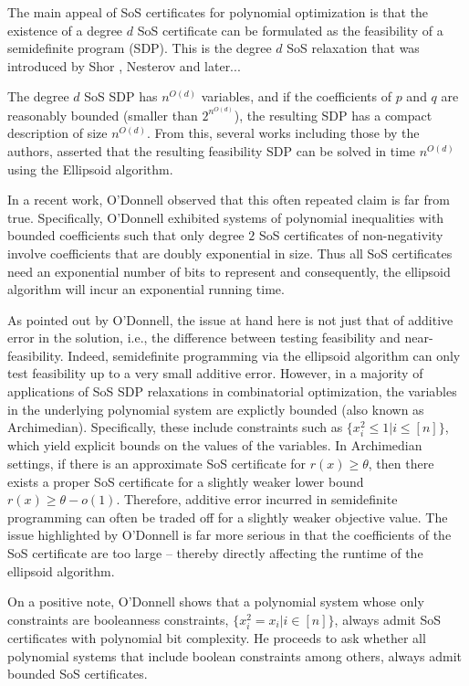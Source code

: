 The main appeal of SoS certificates for polynomial optimization is that the existence of a degree $d$ SoS certificate can be formulated as the feasibility of a semidefinite program (SDP).
%
This is the degree $d$ SoS relaxation that was introduced by Shor \cite{Shor87}, Nesterov \cite{Nes00} and later...

The degree $d$ SoS SDP has $n^{O(d)}$ variables, and if the coefficients of $p$ and $q$ are reasonably bounded (smaller than $2^{n^{O(d)}}$), the resulting SDP has a compact description of size $n^{O(d)}$.
%
From this, several works including those by the authors, asserted that the resulting feasibility SDP can be solved in time $n^{O(d)}$ using the Ellipsoid algorithm.

In a recent work, O'Donnell \cite{odonnell17} observed that this often repeated claim is far from true.
%
Specifically, O'Donnell exhibited systems of polynomial inequalities with bounded coefficients such that only degree $2$ SoS certificates of non-negativity involve coefficients that are doubly exponential in size.
%
Thus all SoS certificates need an exponential number of bits to represent and consequently, the ellipsoid algorithm will incur an exponential running time.
%
 
As pointed out by O'Donnell, the issue at hand here is not just that of additive error in the solution, i.e., the difference between testing feasibility and near-feasibility.  
%
Indeed, semidefinite programming via the ellipsoid algorithm can only test feasibility up to a very small additive error.
%
However, in a majority of applications of SoS SDP relaxations in combinatorial optimization, the variables in the underlying polynomial system are explictly bounded (also known as Archimedian).
%
Specifically, these include constraints such as $\{ x_i^2 \leq 1 | i \leq [n]\}$, which yield explicit bounds on the values of the variables.
%
In Archimedian settings, if there is an approximate SoS certificate for $r(x) \geq \theta$, then there exists a proper SoS certificate for a slightly weaker lower bound $r(x) \geq \theta - o(1)$.
%
Therefore, additive error incurred in semidefinite programming can often be traded off for a slightly weaker objective value.
%
The issue highlighted by O'Donnell is far more serious in that the coefficients of the SoS certificate are too large -- thereby directly affecting the runtime of the ellipsoid algorithm.

On a positive note, O'Donnell shows that a polynomial system whose only constraints are booleanness constraints, $\{x_i^2 = x_i | i \in [n]\}$, always admit SoS certificates with polynomial bit complexity.  
%
He proceeds to ask whether all polynomial systems that include boolean constraints among others, always admit bounded SoS certificates.


